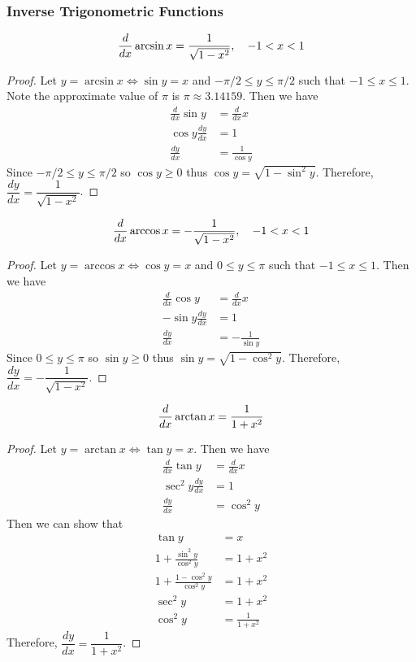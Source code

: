 \subsubsection{Inverse Trigonometric Functions}
\begin{theorem}
    \[\frac{d}{dx}\arcsin x=\frac{1}{\sqrt{1-x^2}},\quad -1<x<1 \qedhere\]
\end{theorem}
\begin{proof}
    Let \(y=\arcsin x \iff \sin y=x\) and \(-\pi/2\leq y\leq\pi/2\) such that
    \(-1\leq x\leq 1\).
    Note the approximate value of \(\pi\) is \(\pi\approx 3.14159\).
    Then we have
    \begin{align*}
        \frac{d}{dx}\sin y &= \frac{d}{dx}x \\ \cos y\frac{dy}{dx} &= 1 \\
        \frac{dy}{dx} &= \frac{1}{\cos y}
    \end{align*}
    Since \(-\pi/2\leq y\leq\pi/2\) so \(\cos y\geq0\) thus
    \(\cos y=\sqrt{1-\sin^2 y}\).
    Therefore, \(\dfrac{dy}{dx}=\dfrac{1}{\sqrt{1-x^2}}\).
\end{proof}
\begin{theorem}
    \[\frac{d}{dx}\arccos x=-\frac{1}{\sqrt{1-x^2}},\quad -1<x<1 \qedhere\]
\end{theorem}
\begin{proof}
    Let \(y=\arccos x \iff \cos y=x\) and \(0\leq y\leq\pi\) such that
    \(-1\leq x\leq 1\).
    Then we have
    \begin{align*}
        \frac{d}{dx}\cos y &= \frac{d}{dx}x \\ -\sin y\frac{dy}{dx} &= 1 \\
        \frac{dy}{dx} &= -\frac{1}{\sin y}
    \end{align*}
    Since \(0\leq y\leq\pi\) so \(\sin y\geq0\) thus
    \(\sin y=\sqrt{1-\cos^2 y}\).
    Therefore, \(\dfrac{dy}{dx}=-\dfrac{1}{\sqrt{1-x^2}}\).
\end{proof}
\begin{theorem}
    \[\frac{d}{dx}\arctan x=\frac{1}{1+x^2} \qedhere\]
\end{theorem}
\begin{proof}
    Let \(y=\arctan x \iff \tan y=x\).
    Then we have
    \begin{align*}
        \frac{d}{dx}\tan y &= \frac{d}{dx}x \\ \sec^2 y\frac{dy}{dx} &= 1 \\
        \frac{dy}{dx} &= \cos^2 y
    \end{align*}
    Then we can show that
    \begin{align*}
        \tan y &= x \\ 1+\frac{\sin^2 y}{\cos^2 y} &= 1+x^2\\
        1+\frac{1-\cos^2 y}{\cos^2 y} &= 1+x^2 \\ \sec^2 y &= 1+x^2 \\
        \cos^2y &= \frac{1}{1+x^2}
    \end{align*}
    Therefore, \(\dfrac{dy}{dx}=\dfrac{1}{1+x^2}\).
\end{proof}